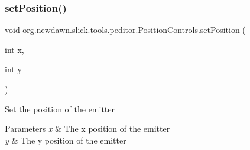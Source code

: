 \subsubsection{\texorpdfstring{set\+Position()}{setPosition()}}
{\footnotesize\ttfamily void org.\+newdawn.\+slick.\+tools.\+peditor.\+Position\+Controls.\+set\+Position (\begin{DoxyParamCaption}\item[{int}]{x,  }\item[{int}]{y }\end{DoxyParamCaption})\hspace{0.3cm}{\ttfamily [inline]}}

Set the position of the emitter


\begin{DoxyParams}{Parameters}
{\em x} & The x position of the emitter \\
\hline
{\em y} & The y position of the emitter \\
\hline
\end{DoxyParams}

